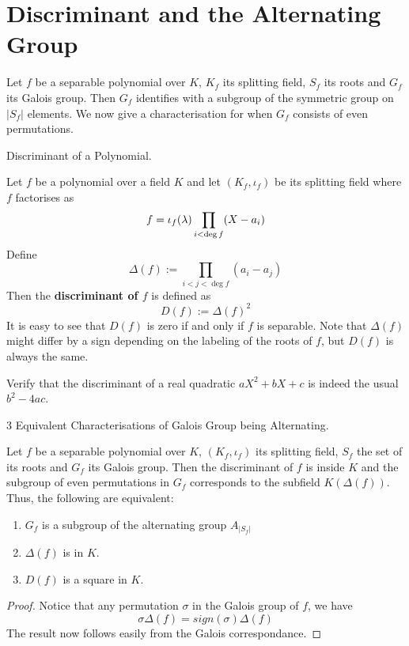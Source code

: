 \documentclass[../book.tex]{subfiles}
\begin{document}
\section{Discriminant and the Alternating Group}

\begin{rmk}
    Let $f$ be a separable polynomial over $K$, $K_f$ its splitting field,
    $S_f$ its roots and $G_f$ its Galois group. 
    Then $G_f$ identifies with a subgroup of the symmetric group on $|S_f|$ elements.
    We now give a characterisation for when $G_f$ consists of even permutations. 
\end{rmk}

\begin{dfn} Discriminant of a Polynomial. 
    
    Let $f$ be a polynomial over a field $K$
    and let $(K_f,\iota_f)$ be its splitting field
    where $f$ factorises as \[
        f = \iota_f(\lambda) \prod_{i < \deg f} (X - a_i)
    \]
    Define \[
        \Delta(f) := \prod_{i < j < \deg f} (a_i - a_j)
    \]
    Then the \textbf{discriminant of $f$} is defined as \[
        D(f) := \Delta(f)^2
    \]
    It is easy to see that $D(f)$ is zero if and only if $f$ is separable. 
    Note that $\Delta(f)$ might differ by a sign depending on
    the labeling of the roots of $f$, but $D(f)$ is always the same. 
    
\end{dfn}

\begin{ex}
    Verify that the discriminant of a real quadratic $aX^2 + bX + c$
    is indeed the usual $b^2 - 4ac$. 
\end{ex}

\begin{thm} 3 Equivalent Characterisations of Galois Group being Alternating.
    
    Let $f$ be a separable polynomial over $K$, $(K_f,\iota_f)$ its splitting field,
    $S_f$ the set of its roots and $G_f$ its Galois group. 
    Then the discriminant of $f$ is inside $K$ and 
    the subgroup of even permutations in $G_f$ corresponds 
    to the subfield $K(\Delta(f))$.
    Thus, the following are equivalent: 
    \begin{enumerate}
        \item $G_f$ is a subgroup of the alternating group $A_{|S_f|}$
        \item $\Delta(f)$ is in $K$.
        \item $D(f)$ is a square in $K$. 
    \end{enumerate}
    
\end{thm}
\begin{proof}
    
    Notice that any permutation $\sigma$ in the Galois group of $f$, 
    we have \[
        \sigma \Delta(f) = sign(\sigma) \Delta(f)
    \]
    The result now follows easily from the Galois correspondance. 
    
\end{proof}
\end{document}
